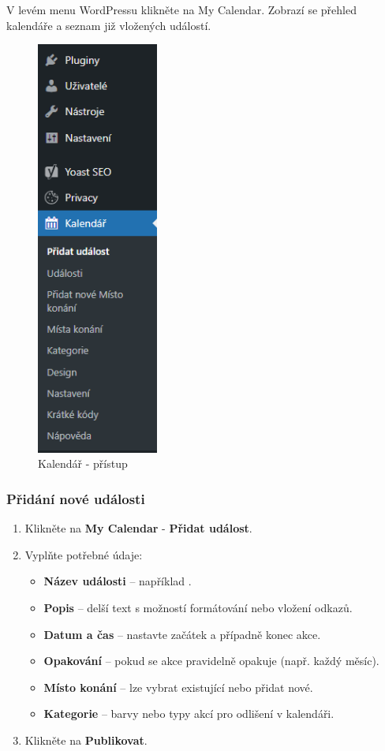 \documentclass[12pt,a4paper]{article}
\begin{document}
	V levém menu WordPressu klikněte na My Calendar. Zobrazí se přehled kalendáře a seznam již vložených událostí.
	
	
	\begin{figure}[htp]
		\centering
		\includegraphics[width=4cm]{WPcalendarmenu.png}
		\caption{Kalendář - přístup}
		\label{fig:role}
	\end{figure}
	
	\subsubsection{Přidání nové události}

	\begin{enumerate}
		\item Klikněte na \textbf{My Calendar} - \textbf{Přidat událost}.
		\item Vyplňte potřebné údaje:
		\begin{itemize}
			\item \textbf{Název události} – například .
			\item \textbf{Popis} – delší text s možností formátování nebo vložení odkazů.
			\item \textbf{Datum a čas} – nastavte začátek a případně konec akce.
			\item \textbf{Opakování} – pokud se akce pravidelně opakuje (např. každý měsíc).
			\item \textbf{Místo konání} – lze vybrat existující nebo přidat nové.
			\item \textbf{Kategorie} – barvy nebo typy akcí pro odlišení v kalendáři.
		\end{itemize}
		\item Klikněte na \textbf{Publikovat}.
	\end{enumerate}
	
\end{document}

